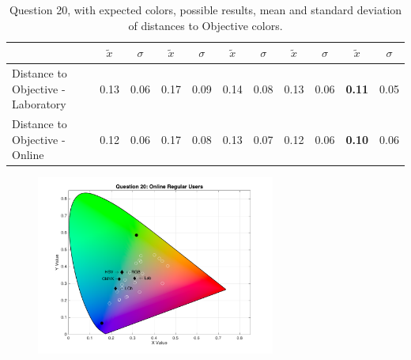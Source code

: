 \begin{itemize}
\begin{table}[H]
{\begin{tabular}{lccccccccccccc}
                                                        & \multicolumn{1}{l}{} & \multicolumn{1}{l}{}      & \multicolumn{1}{l}{}                                       & $\tilde{x}$           & $\sigma$                           & $\tilde{x}$           & $\sigma$                           & $\tilde{x}$          & $\sigma$                           & $\tilde{x}$          & $\sigma$                           & $\tilde{x}$           & $\sigma$                          \\ \hline
      \multicolumn{4}{l|}{Distance to Objective - Laboratory}                                                                                                            & 0.13                  & \multicolumn{1}{c|}{0.06}          & 0.17                  & \multicolumn{1}{c|}{0.09}          & 0.14                 & \multicolumn{1}{c|}{0.08}          & 0.13                 & \multicolumn{1}{c|}{0.06}          & \textbf{0.11}         & \multicolumn{1}{c|}{0.05}         \\
      \multicolumn{4}{l|}{Distance to Objective - Online}                                                                                                                & 0.12                  & \multicolumn{1}{c|}{0.06}          & 0.17                  & \multicolumn{1}{c|}{0.08}          & 0.13                 & \multicolumn{1}{c|}{0.07}          & 0.12                 & \multicolumn{1}{c|}{0.06}          & \textbf{0.10}         & \multicolumn{1}{c|}{0.06}         \\ \hline
    \end{tabular}}
    \caption[Question 20, with expected Results.]{Question 20, with expected colors, possible results, mean and standard deviation of distances to Objective colors.}
    \label{table:lab_q20_expected}
  \end{table}
  \begin{figure}[!htbp]
    \centering
    \includegraphics[width=0.7\textwidth]{images/20_online_regularUsers.png}

\end{figure}
\end{itemize}
